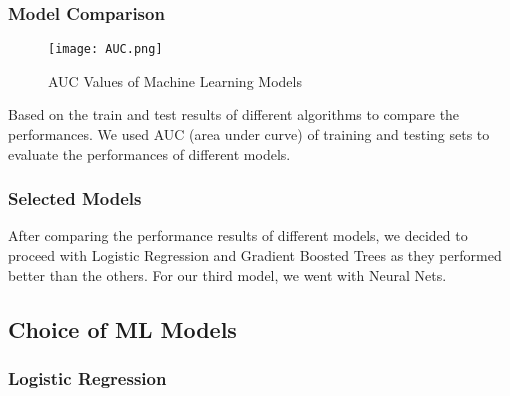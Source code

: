 \documentclass{article}
\begin{document}
\subsubsection{Model Comparison}

\begin{figure}[H]
  \centering
  \texttt{[image: AUC.png]}
  \caption{AUC Values of Machine Learning Models}
\end{figure}

Based on the train and test results of different algorithms to compare the performances. We used AUC (area under curve) of training and testing sets to evaluate the performances of different models.


\subsubsection{Selected Models}

After comparing the performance results of different models, we decided to proceed with Logistic Regression and Gradient Boosted Trees as they performed better than the others. For our third model, we went with Neural Nets.

\newpage
\subsection{Choice of ML Models}
\subsubsection{Logistic Regression}
\end{document}
